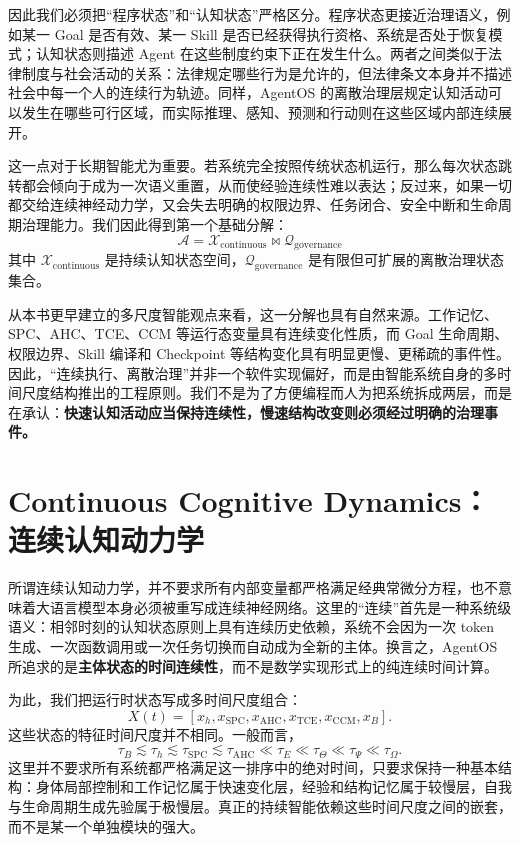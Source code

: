 因此我们必须把“程序状态”和“认知状态”严格区分。程序状态更接近治理语义，例如某一 Goal 是否有效、某一 Skill 是否已经获得执行资格、系统是否处于恢复模式；认知状态则描述 Agent 在这些制度约束下正在发生什么。两者之间类似于法律制度与社会活动的关系：法律规定哪些行为是允许的，但法律条文本身并不描述社会中每一个人的连续行为轨迹。同样，AgentOS 的离散治理层规定认知活动可以发生在哪些可行区域，而实际推理、感知、预测和行动则在这些区域内部连续展开。

这一点对于长期智能尤为重要。若系统完全按照传统状态机运行，那么每次状态跳转都会倾向于成为一次语义重置，从而使经验连续性难以表达；反过来，如果一切都交给连续神经动力学，又会失去明确的权限边界、任务闭合、安全中断和生命周期治理能力。我们因此得到第一个基础分解：
\[
\boxed{
\mathcal A
=
\mathcal X_{\mathrm{continuous}}
\bowtie
\mathcal Q_{\mathrm{governance}}
}
\]
其中 \(\mathcal X_{\mathrm{continuous}}\) 是持续认知状态空间，\(\mathcal Q_{\mathrm{governance}}\) 是有限但可扩展的离散治理状态集合。

从本书更早建立的多尺度智能观点来看，这一分解也具有自然来源。工作记忆、SPC、AHC、TCE、CCM 等运行态变量具有连续变化性质，而 Goal 生命周期、权限边界、Skill 编译和 Checkpoint 等结构变化具有明显更慢、更稀疏的事件性。因此，“连续执行、离散治理”并非一个软件实现偏好，而是由智能系统自身的多时间尺度结构推出的工程原则。我们不是为了方便编程而人为把系统拆成两层，而是在承认：\textbf{快速认知活动应当保持连续性，慢速结构改变则必须经过明确的治理事件。}

\section{Continuous Cognitive Dynamics：连续认知动力学}

所谓连续认知动力学，并不要求所有内部变量都严格满足经典常微分方程，也不意味着大语言模型本身必须被重写成连续神经网络。这里的“连续”首先是一种系统级语义：相邻时刻的认知状态原则上具有连续历史依赖，系统不会因为一次 token 生成、一次函数调用或一次任务切换而自动成为全新的主体。换言之，AgentOS 所追求的是\textbf{主体状态的时间连续性}，而不是数学实现形式上的纯连续时间计算。

为此，我们把运行时状态写成多时间尺度组合：
\[
X(t)
=
\left[
x_h,
x_{\mathrm{SPC}},
x_{\mathrm{AHC}},
x_{\mathrm{TCE}},
x_{\mathrm{CCM}},
x_B
\right].
\]
这些状态的特征时间尺度并不相同。一般而言，
\[
\tau_B
\lesssim
\tau_h
\lesssim
\tau_{\mathrm{SPC}}
\lesssim
\tau_{\mathrm{AHC}}
\ll
\tau_E
\ll
\tau_\Theta
\ll
\tau_\Psi
\ll
\tau_\Omega .
\]
这里并不要求所有系统都严格满足这一排序中的绝对时间，只要求保持一种基本结构：身体局部控制和工作记忆属于快速变化层，经验和结构记忆属于较慢层，自我与生命周期生成先验属于极慢层。真正的持续智能依赖这些时间尺度之间的嵌套，而不是某一个单独模块的强大。

